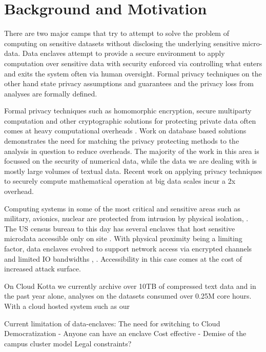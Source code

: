 \section{Background and Motivation} \label{sec:background}

There are two major camps that try to attempt to solve the problem of computing on sensitive
datasets without disclosing the underlying sensitive micro-data. Data enclaves attempt to
provide a secure environment to apply computation over sensitive data with security enforced
via controlling what enters and exits the system often via human oversight. Formal privacy
techniques on the other hand state privacy assumptions and guarantees and the privacy loss
from analyses are formally defined.

Formal privacy techniques such as homomorphic encryption, secure multiparty computation and
other cryptographic solutions for protecting private data often comes at heavy computational
overheads \cite{naehrig2011can}. Work on database based solutions \cite{popa2011cryptdb}
demonstrates the need for matching the privacy protecting methods to the analysis in question
to reduce overheads. The majority of the work in this area is focussed on the security of
numerical data, while the data we are dealing with is mostly large volumes of textual data.
Recent work \cite{kepner2014computing} on applying privacy techniques to securely compute
mathematical operation at big data scales incur a 2x overhead.

Computing systems in some of the most critical and sensitive areas such as military, avionics,
nuclear are protected from intrusion by physical isolation\cite{byres2013air}, \cite{ross2013security}.
The US census bureau to this day has several enclaves that host sensitive microdata accessible
only on site \cite{rdc_uscensus}. With physical proximity being a limiting factor, data enclaves
evolved to support network access via encrypted channels and limited IO bandwidths \cite{lane2008using}, \cite{grossman2016toward}.
Accessibility in this case comes at the cost of increased attack surface.

On Cloud Kotta we currently archive over 10TB of compressed text data and in the past year
alone, analyses on the datasets consumed over 0.25M core hours. With a cloud hosted system
such as our


Current limitation of data-enclaves:
The need for switching to Cloud
      Democratization - Anyone can have an enclave
      Cost effective - Demise of the campus cluster model
      Legal constraints?

